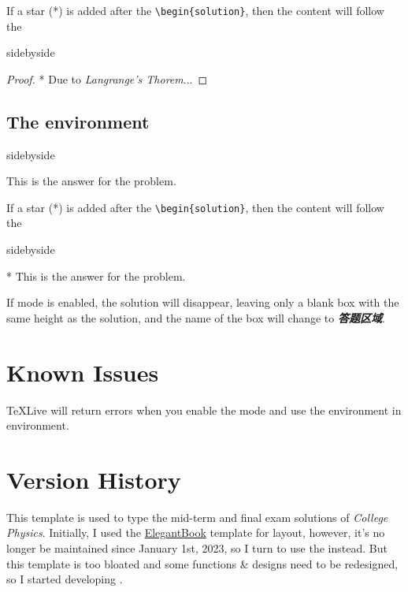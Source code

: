 If a star (*) is added after the \verb|\begin{solution}|, then the content will follow the 
\begin{tcblisting}{sidebyside}
\begin{proof}*
    Due to \emph{Langrange's Thorem}...
\end{proof}
\end{tcblisting}

\subsection{The  environment}
\begin{tcblisting}{sidebyside}
\begin{solution}
    This is the answer for the problem.
\end{solution}
\end{tcblisting}

If a star (*) is added after the \verb|\begin{solution}|, then the content will follow the 
\begin{tcblisting}{sidebyside}
\begin{solution}*
    This is the answer for the problem.
\end{solution}
\end{tcblisting}

If mode  is enabled, the solution will disappear, leaving only a blank box with the same height as the solution, and the name of the box will change to \emph{\textcolor{1号色}{\textbf{ 答题区域}}}.

\section{Known Issues}
\TeX Live will return errors when you enable the mode  and use the  environment in  environment.

\section{Version History}
This template is used to type the mid-term and final exam solutions of \emph{College Physics}. Initially, I used the \href{https://www.ctan.org/pkg/elegantbook}{ElegantBook} template for layout, however, it's no longer be maintained since January 1st, 2023, so I turn to use the \href{https://github.com/Azure1210/VividBooK}{} instead. But this template is too bloated and some functions \& designs need to be redesigned, so I started developing .

